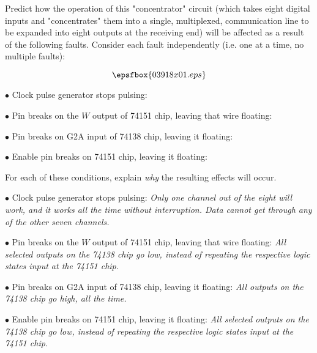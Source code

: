

Predict how the operation of this "concentrator" circuit (which takes eight digital inputs and "concentrates" them into a single, multiplexed, communication line to be expanded into eight outputs at the receiving end) will be affected as a result of the following faults.  Consider each fault independently (i.e. one at a time, no multiple faults):

$$\epsfbox{03918x01.eps}$$

\medskip
\item{$\bullet$} Clock pulse generator stops pulsing:
\vskip 5pt
\item{$\bullet$} Pin breaks on the $W$ output of 74151 chip, leaving that wire floating:
\vskip 5pt
\item{$\bullet$} Pin breaks on G2A input of 74138 chip, leaving it floating:
\vskip 5pt
\item{$\bullet$} Enable pin breaks on 74151 chip, leaving it floating:
\medskip

For each of these conditions, explain {\it why} the resulting effects will occur.







\medskip
\item{$\bullet$} Clock pulse generator stops pulsing: {\it Only one channel out of the eight will work, and it works all the time without interruption.  Data cannot get through any of the other seven channels.}
\vskip 5pt
\item{$\bullet$} Pin breaks on the $W$ output of 74151 chip, leaving that wire floating: {\it All selected outputs on the 74138 chip go low, instead of repeating the respective logic states input at the 74151 chip.}
\vskip 5pt
\item{$\bullet$} Pin breaks on G2A input of 74138 chip, leaving it floating: {\it All outputs on the 74138 chip go high, all the time.}
\vskip 5pt
\item{$\bullet$} Enable pin breaks on 74151 chip, leaving it floating: {\it All selected outputs on the 74138 chip go low, instead of repeating the respective logic states input at the 74151 chip.}
\medskip

